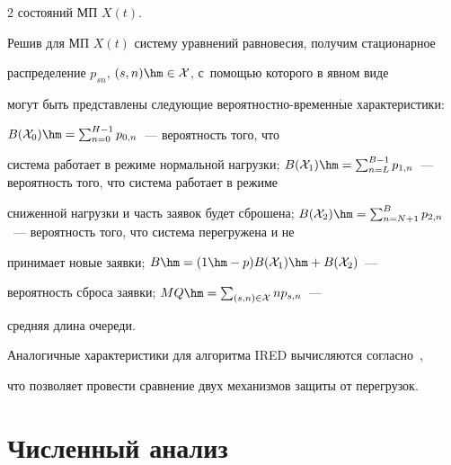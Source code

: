 \begin{multicols}{2}
состояний МП $X(t)$.


  


  Решив для МП $X(t)$ систему уравнений равновесия, получим стационарное 


распределение $p_{sn}$, $(s,n)\hm\in \mathcal{X}$, с~помощью которого в явном виде 


могут быть представлены следующие ве\-ро\-ят\-но\-ст\-но-вре\-мен\-н$\acute{\mbox{ы}}$е характеристики: 


$B(\mathcal{X}_0)\hm= \sum\nolimits_{n=0}^{H-1} p_{0,n}$~---  вероятность того, что 


система работает в режиме нормальной нагрузки; $B(\mathcal{X}_1)\hm= 


\sum\nolimits_{n=L}^{B-1} p_{1,n}$~--- вероятность того, что сис\-те\-ма работает в режиме 


сниженной нагрузки и часть заявок будет сброшена; $B(\mathcal{X}_2)\hm= 


\sum\nolimits_{n=N+1}^B p_{2,n}$~--- вероятность того, что сис\-те\-ма перегружена и не 


принимает новые заявки; $B\hm= (1\hm-p) B(\mathcal{X}_1) \hm+ B(\mathcal{X}_2)$~--- 


вероятность сброса заявки; $MQ\hm= \sum\nolimits_{(s,n)\in \mathcal{X}} np_{s,n}$~--- 


средняя длина очереди.











  Аналогичные характеристики для алгоритма IRED вычисляются согласно~\cite{5-al}, 


что позволяет провести сравнение двух механизмов защиты от перегрузок.





\vspace*{-6pt}


  


\section{Численный анализ}





\vspace*{-3pt}






\end{multicols}
